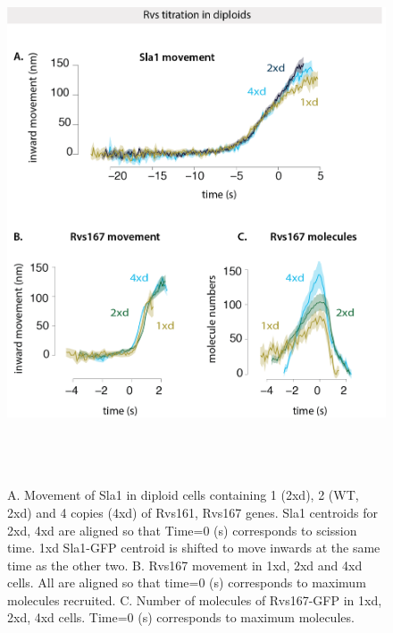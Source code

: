 \newpage
						\begin{figure}[H]
						\centering
						\includegraphics[width=16cm,height=16cm,keepaspectratio]{figures/results_final/protein_friction4}
							\vspace*{2mm}
						\caption[Titration of Rvs molecule numbers in diploid cells]
						{A. Movement of Sla1 in diploid cells containing 1 (2xd), 2 (WT, 2xd) and 4 copies (4xd) of Rvs161, Rvs167 genes. Sla1 centroids for 2xd, 4xd are aligned so that Time=0 (s) corresponds to scission time. 1xd Sla1-GFP centroid is shifted to move inwards at the same time as the other two.
						B. Rvs167 movement in 1xd, 2xd and 4xd cells. All are aligned so that time=0 (s) corresponds to maximum molecules recruited.
						C.  Number of molecules of Rvs167-GFP in 1xd, 2xd, 4xd cells. Time=0 (s) corresponds to maximum molecules. 
						\label{fig_rvsdiploid}}
						\end{figure}
				
				
			

